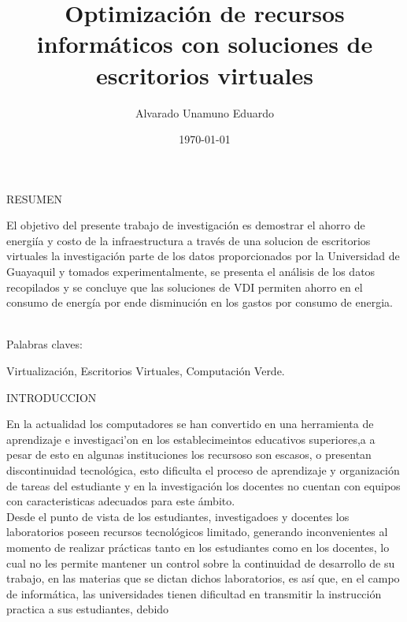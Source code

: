 \documentclass[a4paper,11pt]{article}
\begin{document}
\title{Optimizaci\'on de recursos inform\'aticos con soluciones de escritorios virtuales}
\author{Alvarado Unamuno Eduardo}
\date{\today}
\maketitle
\begin{bf}
\begin{center}
RESUMEN \\
\end{center}
\end{bf}
El objetivo del presente trabajo de investigaci\'on es demostrar 
el ahorro de energi\'ia y costo de la infraestructura a trav\'es 
de una solucion de escritorios virtuales la investigaci\'on parte de los datos proporcionados 
por la Universidad de Guayaquil y tomados experimentalmente, se presenta el an\'alisis de los 
datos recopilados y se concluye que las soluciones de VDI permiten ahorro en el consumo de energ\'ia
por ende disminuci\'on en los gastos por consumo de energia.\\   
\\
\begin{bf}
Palabras claves:
\end{bf}
Virtualizaci\'on, Escritorios Virtuales, Computación Verde. \\
\begin{bf}
\begin{center}
INTRODUCCION\\
\end{center}
\end{bf}
En la actualidad los computadores se han convertido en una herramienta de 
aprendizaje e investigaci'on en los establecimeintos educativos superiores,a a pesar de esto
en algunas instituciones los recursoso son escasos, o presentan discontinuidad
tecnol\'ogica, esto dificulta el proceso de aprendizaje y organizaci\'on de
tareas del estudiante y en la investigaci\'on los docentes no cuentan con
equipos con caracteristicas adecuados para este \'ambito.\\
Desde el punto de vista de los estudiantes, investigadoes y docentes los laboratorios
poseen recursos tecnol\'ogicos limitado, generando inconvenientes al momento
de realizar pr\'acticas tanto en los estudiantes como en los docentes,
lo cual no les permite mantener un control sobre la continuidad de desarrollo de su trabajo,
en las materias que se dictan dichos laboratorios, es as\'i que, en el campo de informática, 
las universidades tienen dificultad en transmitir la instrucci\'on practica a sus estudiantes, debido
\end{document}
